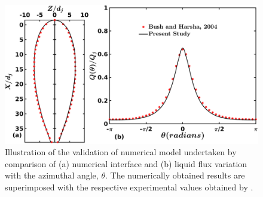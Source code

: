 \begin{figure}
    \centering
    \includegraphics[width=\linewidth]{chapters/jetJet/Figure3}
    \caption{Illustration of the validation of numerical model undertaken by comparison of (a) numerical interface and (b) liquid flux variation with the azimuthal angle, $\theta$. The numerically obtained results are superimposed with the respective experimental values obtained by \citet{bush2004collision}.}
    \label{Figure::validation}
\end{figure}

